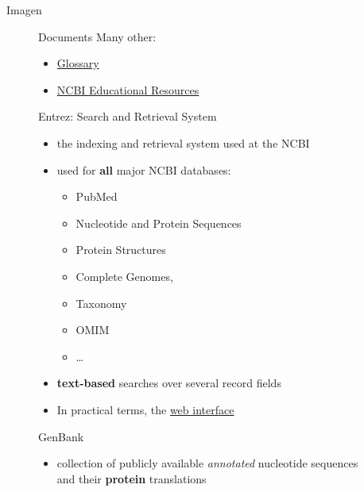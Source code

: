 \begin{frame}{Imagen}
\begin{figure}[htbp]
\begin{frame}{Documents}
Many other:

\begin{itemize}
\itemsep1pt\parskip0pt
\item
  \href{http://www.ncbi.nlm.nih.gov/books/NBK21106/}{Glossary}
\item
  \href{http://www.ncbi.nlm.nih.gov/education/}{NCBI Educational
  Resources}
\end{itemize}

\end{frame}

\begin{frame}{Entrez: Search and Retrieval System}

\begin{itemize}
\itemsep1pt\parskip0pt
\item
  the indexing and retrieval system used at the NCBI
\item
  used for \textbf{all} major NCBI databases:

  \begin{itemize}
  \itemsep1pt\parskip0pt
  \item
    PubMed
  \item
    Nucleotide and Protein Sequences
  \item
    Protein Structures
  \item
    Complete Genomes,
  \item
    Taxonomy
  \item
    OMIM
  \item
    \ldots{}
  \end{itemize}
\item
  \textbf{text-based} searches over several record fields
\item
  In practical terms, the \href{http://www.ncbi.nlm.nih.gov/}{web
  interface}
\end{itemize}

\end{frame}

\begin{frame}{GenBank}

\begin{itemize}
\itemsep1pt\parskip0pt
\item
  collection of publicly available \emph{annotated} nucleotide sequences
  and their \textbf{protein} translations


\end{itemize}
\end{frame}
\end{figure}
\end{frame}
